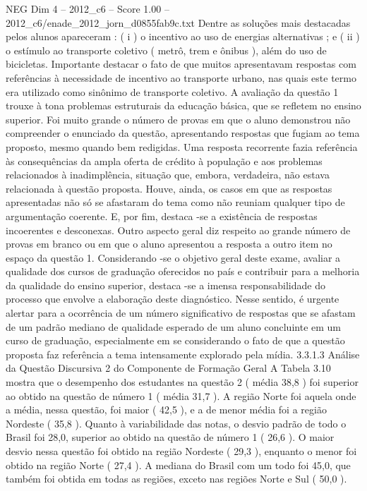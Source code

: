 \begin{textsample}{NEG Dim 4 – 2012\_c6 – Score 1.00 – 2012\_c6/enade\_2012\_jorn\_d0855fab9c.txt}
Dentre as soluções mais destacadas pelos alunos apareceram : ( i ) o incentivo ao uso de energias alternativas ; e ( ii ) o estímulo ao transporte coletivo ( metrô, trem e ônibus ), além do uso de bicicletas.
Importante destacar o fato de que muitos apresentavam respostas com referências à necessidade de incentivo ao transporte urbano, nas quais este termo era utilizado como sinônimo de transporte coletivo.
A avaliação da questão 1 trouxe à tona problemas estruturais da educação básica, que se refletem no ensino superior.
Foi muito grande o número de provas em que o aluno demonstrou não compreender o enunciado da questão, apresentando respostas que fugiam ao tema proposto, mesmo quando bem redigidas.
Uma resposta recorrente fazia referência às consequências da ampla oferta de crédito à população e aos problemas relacionados à inadimplência, situação que, embora, verdadeira, não estava relacionada à questão proposta.
Houve, ainda, os casos em que as respostas apresentadas não só se afastaram do tema como não reuniam qualquer tipo de argumentação coerente.
E, por fim, destaca -se a existência de respostas incoerentes e desconexas.
Outro aspecto geral diz respeito ao grande número de provas em branco ou em que o aluno apresentou a resposta a outro item no espaço da questão 1.
Considerando -se o objetivo geral deste exame, avaliar a qualidade dos cursos de graduação oferecidos no país e contribuir para a melhoria da qualidade do ensino superior, destaca -se a imensa responsabilidade do processo que envolve a elaboração deste diagnóstico.
Nesse sentido, é urgente alertar para a ocorrência de um número significativo de respostas que se afastam de um padrão mediano de qualidade esperado de um aluno concluinte em um curso de graduação, especialmente em se considerando o fato de que a questão proposta faz referência a tema intensamente explorado pela mídia. 3.3.1.3 Análise da Questão Discursiva 2 do Componente de Formação Geral A Tabela 3.10 mostra que o desempenho dos estudantes na questão 2 ( média 38,8 ) foi superior ao obtido na questão de número 1 ( média 31,7 ).
A região Norte foi aquela onde a média, nessa questão, foi maior ( 42,5 ), e a de menor média foi a região Nordeste ( 35,8 ).
Quanto à variabilidade das notas, o desvio padrão de todo o Brasil foi 28,0, superior ao obtido na questão de número 1 ( 26,6 ).
O maior desvio nessa questão foi obtido na região Nordeste ( 29,3 ), enquanto o menor foi obtido na região Norte ( 27,4 ).
A mediana do Brasil com um todo foi 45,0, que também foi obtida em todas as regiões, exceto nas regiões Norte e Sul ( 50,0 ).

\end{textsample}
